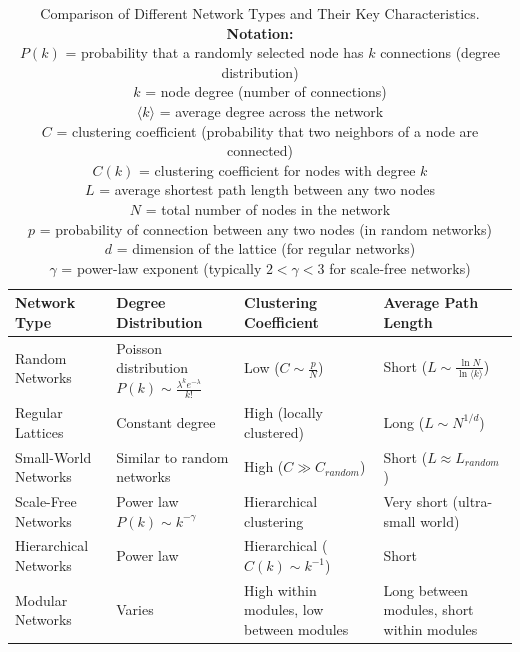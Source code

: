 \begin{table}[htbp]
    \centering
    \caption{Comparison of Different Network Types and Their Key Characteristics.
        \textbf{Notation:}\\
        $P(k)$ = probability that a randomly selected node has $k$ connections (degree distribution)\\
        $k$ = node degree (number of connections)\\
        $\langle k \rangle$ = average degree across the network\\
        $C$ = clustering coefficient (probability that two neighbors of a node are connected)\\
        $C(k)$ = clustering coefficient for nodes with degree $k$\\
        $L$ = average shortest path length between any two nodes\\
        $N$ = total number of nodes in the network\\
        $p$ = probability of connection between any two nodes (in random networks)\\
        $d$ = dimension of the lattice (for regular networks)\\
        $\gamma$ = power-law exponent (typically $2 < \gamma < 3$ for scale-free networks)}
    \begin{tabular}{p{2.5cm}|p{3cm}|p{3cm}|p{3cm}}
        \hline
        \textbf{Network Type} & \textbf{Degree Distribution} & \textbf{Clustering Coefficient} & \textbf{Average Path Length} \\
        \hline
        Random Networks & Poisson distribution $P(k) \sim \frac{\lambda^k e^{-\lambda}}{k!}$ & Low ($C \sim \frac{p}{N}$) & Short ($L \sim \frac{\ln N}{\ln \langle k \rangle}$) \\
        \hline
        Regular Lattices & Constant degree & High (locally clustered) & Long ($L \sim N^{1/d}$) \\
        \hline
        Small-World Networks & Similar to random networks & High ($C \gg C_{random}$) & Short ($L \approx L_{random}$) \\
        \hline
        Scale-Free Networks & Power law $P(k) \sim k^{-\gamma}$ & Hierarchical clustering & Very short (ultra-small world) \\
        \hline
        Hierarchical Networks & Power law & Hierarchical ($C(k) \sim k^{-1}$) & Short \\
        \hline
        Modular Networks & Varies & High within modules, low between modules & Long between modules, short within modules \\
        \hline
    \end{tabular}
    \label{tab:network_types}
\end{table}

